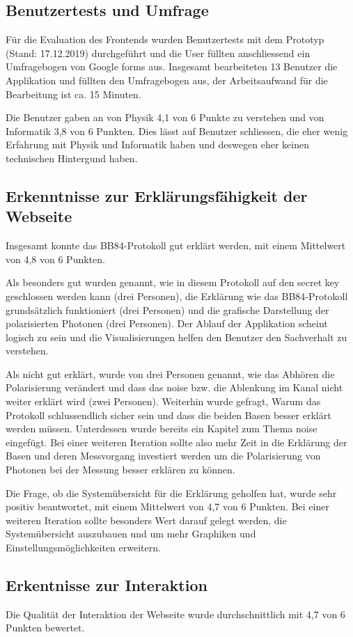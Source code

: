 \documentclass[a4paper,10.2pt,pdftex]{scrartcl}%
\begin{document}
\subsection{Benutzertests und Umfrage}
Für die Evaluation des Frontends wurden Benutzertests mit dem Prototyp (Stand: 17.12.2019) durchgeführt und die User füllten anschliessend ein Umfragebogen von Google forms aus. Insgesamt bearbeiteten 13 Benutzer die Applikation und füllten den Umfragebogen aus, der Arbeitsaufwand für die Bearbeitung ist ca. 15 Minuten.

Die Benutzer gaben an von Physik 4,1 von 6 Punkte zu verstehen und von Informatik 3,8 von 6 Punkten. Dies lässt auf Benutzer schliessen, die eher wenig Erfahrung mit Physik und Informatik haben und deswegen eher keinen technischen Hintergund haben.
\subsection{Erkenntnisse zur Erklärungsfähigkeit der Webseite}
Insgesamt konnte das BB84-Protokoll gut erklärt werden, mit einem Mittelwert von 4,8 von 6 Punkten.

Als besonders gut wurden genannt, wie in diesem Protokoll auf den secret key geschlossen werden kann (drei Personen), die Erklärung wie das BB84-Protokoll grundsätzlich funktioniert (drei Personen) und die grafische Darstellung der polarisierten Photonen (drei Personen). Der Ablauf der Applikation scheint logisch zu sein und die Visualisierungen helfen den Benutzer den Sachverhalt zu verstehen.

Als nicht gut erklärt, wurde von drei Personen genannt, wie das Abhören die Polarisierung verändert und dass das noise bzw. die Ablenkung im Kanal nicht weiter erklärt wird (zwei Personen). Weiterhin wurde gefragt, Warum das Protokoll schlussendlich sicher sein und dass die beiden Basen besser erklärt werden müssen. Unterdessen wurde bereits ein Kapitel zum Thema noise eingefügt. Bei einer weiteren Iteration sollte also mehr Zeit in die Erklärung der Basen und deren Messvorgang investiert werden um die Polarisierung von Photonen bei der Messung besser erklären zu können.

Die Frage, ob die Systemübersicht für die Erklärung geholfen hat, wurde sehr positiv beantwortet, mit einem Mittelwert von 4,7 von 6 Punkten. Bei einer weiteren Iteration sollte besonders Wert darauf gelegt werden, die Systemübersicht auszubauen und um mehr Graphiken und Einstellungsmöglichkeiten erweitern. 
\subsection{Erkentnisse zur Interaktion}
Die Qualität der Interaktion der Webseite wurde durchschnittlich mit 4,7 von 6 Punkten bewertet.
\end{document}
